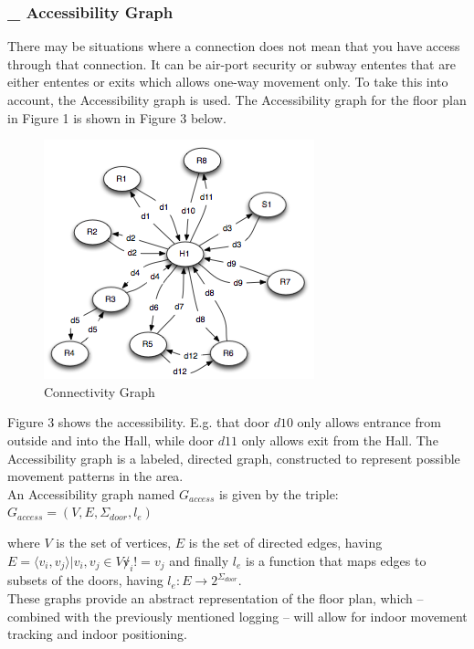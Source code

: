 \subsubsection{ \_ Accessibility Graph}
There may be situations where a connection does not mean that you have access through that connection.
It can be air-port security or subway ententes that are either ententes or exits which allows one-way movement only.
To take this into account, the Accessibility graph is used. 
The Accessibility graph for the floor plan in Figure 1 is shown in Figure 3 below.

\begin{figure}[H]%
\includegraphics{images/accessibilitygraph.png}%
\caption{Connectivity Graph}%
\label{}%
\end{figure}%

Figure 3 shows the accessibility.
E.g. that door $d10$ only allows entrance from outside and into the Hall, while door $d11$ only allows exit from the Hall.
The Accessibility graph is a labeled, directed graph, constructed to represent possible movement patterns in the area. \\

An Accessibility graph named $G_{access}$ is given by the triple: \\

$G_{access} = (V, E, \Sigma_{door}, l_e)$ 

where $V$ is the set of vertices, $E$ is the set of directed edges, having $E = {\langle v_i, v_j \rangle | v_i, v_j \in V \not v_i != v_j}$ and finally $l_e$ is a function that maps edges to subsets of the doors, having $l_e : E \rightarrow 2^{\Sigma_{door}}$. \\

These graphs provide an abstract representation of the floor plan, which -- combined with the previously mentioned logging -- will allow for indoor movement tracking and indoor positioning. 


